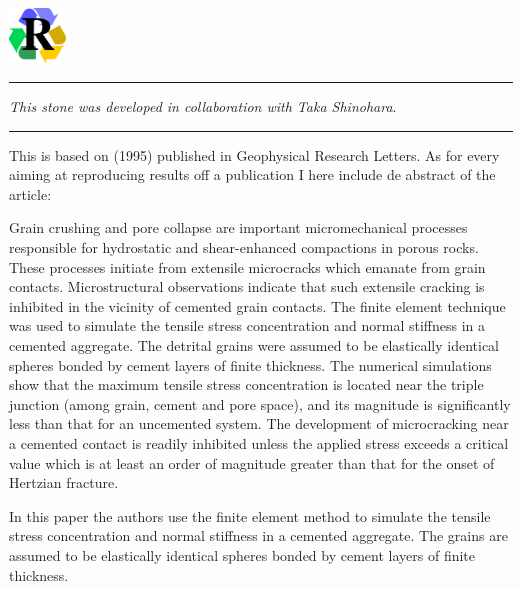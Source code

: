 
\includegraphics[width=1.5cm]{images/pictograms/replication}



\par\noindent\rule{\textwidth}{0.4pt}

{\sl This stone was developed in collaboration with Taka Shinohara}.

\par\noindent\rule{\textwidth}{0.4pt}


This \stone is based on \textcite{wowu95} (1995) published in Geophysical Research Letters. 
As for every \stone aiming at reproducing results off a publication I here include de abstract
of the article:

\begin{center}
\begin{minipage}{13cm}
{\small 
Grain crushing and pore collapse are important micromechanical processes responsible for hydrostatic and 
shear-enhanced compactions in porous rocks. These processes initiate from extensile microcracks which 
emanate from grain contacts. Microstructural observations indicate that such extensile cracking is inhibited 
in the vicinity of cemented grain contacts. The finite element technique was used to simulate the tensile 
stress concentration and normal stiffness in a cemented aggregate. The detrital grains were assumed to 
be elastically identical spheres bonded by cement layers of finite thickness. The numerical simulations 
show that the maximum tensile stress concentration is located near the triple junction (among grain, 
cement and pore space), and its magnitude is significantly less than that for an uncemented system. 
The development of microcracking near a cemented contact is readily inhibited unless the applied 
stress exceeds a critical value which is at least an order of magnitude greater than that for the 
onset of Hertzian fracture.
}
\end{minipage}
\end{center}

In this paper the authors use the finite element method to simulate 
the tensile stress concentration and normal stiffness in a cemented
aggregate. The grains are assumed to be elastically identical spheres
bonded by cement layers of finite thickness.


